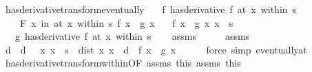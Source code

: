 \begin{isabellebody}
\endisatagproof
{\isafoldproof}%
%
\isadelimproof
\isanewline
%
\endisadelimproof
\isanewline
{}\isamarkupfalse%
\ has{\isacharunderscore}{\kern0pt}derivative{\isacharunderscore}{\kern0pt}transform{\isacharunderscore}{\kern0pt}eventually{\isacharcolon}{\kern0pt}\isanewline
\ \ \ {\isachardoublequoteopen}{\isacharparenleft}{\kern0pt}f\ has{\isacharunderscore}{\kern0pt}derivative\ f{\isacharprime}{\kern0pt}{\isacharparenright}{\kern0pt}\ {\isacharparenleft}{\kern0pt}at\ x\ within\ s{\isacharparenright}{\kern0pt}{\isachardoublequoteclose}\isanewline
\ \ \ \ {\isachardoublequoteopen}{\isacharparenleft}{\kern0pt}{\isasymforall}\isactrlsub F\ x{\isacharprime}{\kern0pt}\ in\ at\ x\ within\ s{\isachardot}{\kern0pt}\ f\ x{\isacharprime}{\kern0pt}\ {\isacharequal}{\kern0pt}\ g\ x{\isacharprime}{\kern0pt}{\isacharparenright}{\kern0pt}{\isachardoublequoteclose}\isanewline
\ \ \ {\isachardoublequoteopen}f\ x\ {\isacharequal}{\kern0pt}\ g\ x{\isachardoublequoteclose}\ {\isachardoublequoteopen}x\ {\isasymin}\ s{\isachardoublequoteclose}\isanewline
\ \ \ {\isachardoublequoteopen}{\isacharparenleft}{\kern0pt}g\ has{\isacharunderscore}{\kern0pt}derivative\ f{\isacharprime}{\kern0pt}{\isacharparenright}{\kern0pt}\ {\isacharparenleft}{\kern0pt}at\ x\ within\ s{\isacharparenright}{\kern0pt}{\isachardoublequoteclose}\isanewline
%
\isadelimproof
\ \ %
\endisadelimproof
%
\isatagproof
{}\isamarkupfalse%
\ assms\isanewline
{}\isamarkupfalse%
\ {\isacharminus}{\kern0pt}\isanewline
\ \ \isamarkupfalse%
\ assms{\isacharparenleft}{\kern0pt}{}{\isacharcomma}{\kern0pt}{}{\isacharparenright}{\kern0pt}\ \isamarkupfalse%
\ d\ \ {\isachardoublequoteopen}d\ {\isachargreater}{\kern0pt}\ {}{\isachardoublequoteclose}\ {\isachardoublequoteopen}{\isasymAnd}x{\isacharprime}{\kern0pt}{\isachardot}{\kern0pt}\ x{\isacharprime}{\kern0pt}\ {\isasymin}\ s\ {\isasymLongrightarrow}\ dist\ x{\isacharprime}{\kern0pt}\ x\ {\isacharless}{\kern0pt}\ d\ {\isasymLongrightarrow}\ f\ x{\isacharprime}{\kern0pt}\ {\isacharequal}{\kern0pt}\ g\ x{\isacharprime}{\kern0pt}{\isachardoublequoteclose}\isanewline
\ \ \ \ \isamarkupfalse%
\ {\isacharparenleft}{\kern0pt}force\ simp{\isacharcolon}{\kern0pt}\ eventually{\isacharunderscore}{\kern0pt}at{\isacharparenright}{\kern0pt}\isanewline
\ \ \isamarkupfalse%
\ has{\isacharunderscore}{\kern0pt}derivative{\isacharunderscore}{\kern0pt}transform{\isacharunderscore}{\kern0pt}within{\isacharbrackleft}{\kern0pt}OF\ assms{\isacharparenleft}{\kern0pt}{}{\isacharparenright}{\kern0pt}\ this{\isacharparenleft}{\kern0pt}{}{\isacharparenright}{\kern0pt}\ assms{\isacharparenleft}{\kern0pt}{}{\isacharparenright}{\kern0pt}\ this{\isacharparenleft}{\kern0pt}{}{\isacharparenright}{\kern0pt}{\isacharbrackright}{\kern0pt}\isanewline

\end{isabellebody}
